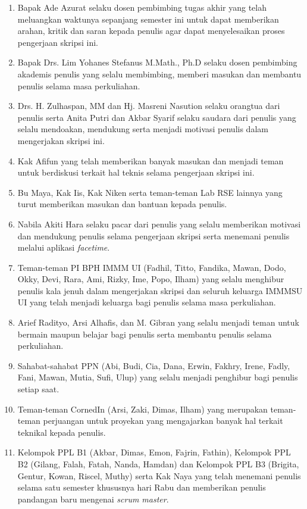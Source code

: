 \begin{enumerate}
\item Bapak Ade Azurat selaku dosen pembimbing tugas akhir yang telah meluangkan waktunya sepanjang semester ini untuk dapat memberikan arahan, kritik dan saran kepada penulis agar dapat menyelesaikan proses pengerjaan skripsi ini.
\item Bapak Drs. Lim Yohanes Stefanus M.Math., Ph.D selaku dosen pembimbing akademis penulis yang selalu membimbing, memberi masukan dan membantu penulis selama masa perkuliahan.
\item Drs. H. Zulhaspan, MM dan Hj. Masreni Nasution selaku orangtua dari penulis serta Anita Putri dan Akbar Syarif selaku saudara dari penulis yang selalu mendoakan, mendukung serta menjadi motivasi penulis dalam mengerjakan skripsi ini.
\item Kak Afifun yang telah memberikan banyak masukan dan menjadi teman untuk berdiskusi terkait hal teknis selama pengerjaan skripsi ini.
\item Bu Maya, Kak Iis, Kak Niken serta teman-teman Lab RSE lainnya yang turut memberikan masukan dan bantuan kepada penulis.
\item Nabila Akiti Hara selaku pacar dari penulis yang selalu memberikan motivasi dan mendukung penulis selama pengerjaan skripsi serta menemani penulis melalui aplikasi \textit{facetime}.
\item Teman-teman PI BPH IMMM UI (Fadhil, Titto, Fandika, Mawan, Dodo, Okky, Devi, Rara, Ami, Rizky, Ime, Popo, Ilham) yang selalu menghibur penulis kala jenuh dalam mengerjakan skripsi dan seluruh keluarga IMMMSU UI yang telah menjadi keluarga bagi penulis selama masa perkuliahan.
\item Arief Radityo, Arsi Alhafis, dan M. Gibran yang selalu menjadi teman untuk bermain maupun belajar bagi penulis serta membantu penulis selama perkuliahan.
\item Sahabat-sahabat PPN (Abi, Budi, Cia, Dana, Erwin, Fakhry, Irene, Fadly, Fani, Mawan, Mutia, Sufi, Ulup) yang selalu menjadi penghibur bagi penulis setiap saat.
\item Teman-teman CornedIn (Arsi, Zaki, Dimas, Ilham) yang merupakan teman-teman perjuangan untuk proyekan yang mengajarkan banyak hal terkait teknikal kepada penulis.
\item Kelompok PPL B1 (Akbar, Dimas, Emon, Fajrin, Fathin), Kelompok PPL B2 (Gilang, Falah, Fatah, Nanda, Hamdan) dan Kelompok PPL B3 (Brigita, Gentur, Kowan, Riscel, Muthy) serta Kak Naya yang telah menemani penulis selama satu semester khususnya hari Rabu dan memberikan penulis pandangan baru mengenai \textit{scrum master}.
\end{enumerate}

